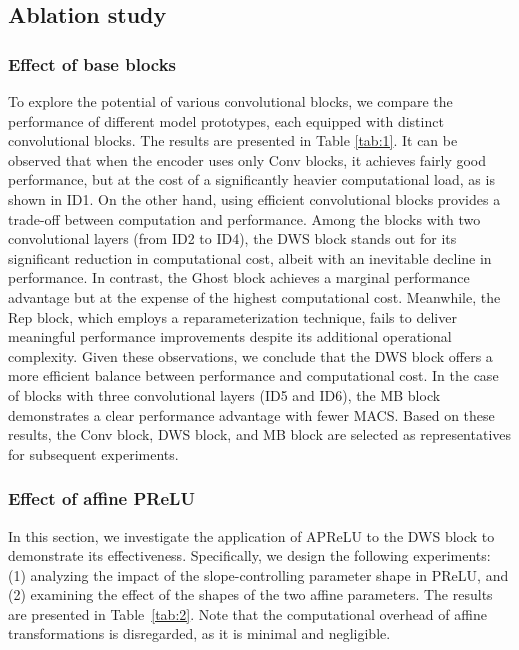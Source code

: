 \documentclass[journal]{IEEEtran}
\newcommand{\rev}[1]{#1}
\begin{document}
\subsection{Ablation study}
\subsubsection{Effect of \rev{base} blocks}
\label{sec:effects_base_blocks}
To explore the potential of various convolutional blocks, we compare the performance of different model prototypes, each equipped with distinct convolutional blocks. The results are presented in Table \ref{tab:1}. It can be observed that when the encoder uses only Conv blocks, it achieves fairly good performance, but at the cost of a significantly heavier computational load, as is shown in ID1. 
On the other hand, using efficient convolutional blocks provides a trade-off between computation and performance. Among the blocks with two convolutional layers (from ID2 to ID4), the DWS block stands out for its significant reduction in computational cost, albeit with an inevitable decline in performance. In contrast, the Ghost block achieves a marginal performance advantage but at the expense of the highest computational cost. Meanwhile, the Rep block, which employs a reparameterization technique, fails to deliver meaningful performance improvements despite its additional operational complexity. Given these observations, we conclude that the DWS block offers a more efficient balance between performance and computational cost. In the case of blocks with three convolutional layers (ID5 and ID6), the MB block demonstrates a clear performance advantage with fewer MACS. Based on these results, the Conv block, DWS block, and MB block are selected as representatives for subsequent experiments.


\subsubsection{Effect of affine PReLU}
In this section, we investigate the application of APReLU to the DWS block to demonstrate its effectiveness. Specifically, we design the following experiments: (1) analyzing the impact of the slope-controlling parameter shape in PReLU, and (2) examining the effect of the shapes of the two affine parameters. The results are presented in Table~\ref{tab:2}. Note that the computational overhead of affine transformations is disregarded, as it is minimal and negligible. 
\end{document}
